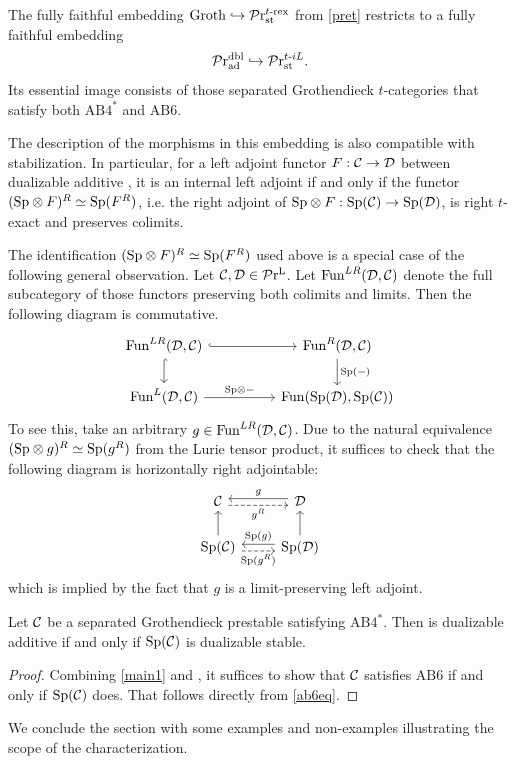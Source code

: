 \documentclass[a4paper,10pt, oneside]{amsart}
\begin{document}
\begin{cor}\label{dualaddembst}
	The fully faithful embedding $\mathrm{Groth} \hookrightarrow \mathcal{P}\mathrm{r}^{t\text{-rex}}_{\mathrm{st}}$ from \cref{pret} restricts to a fully faithful embedding 
	\[ \mathcal{P}\mathrm{r}_{\mathrm{ad}}^{\mathrm{dbl}} \hookrightarrow \mathcal{P}\mathrm{r}^{t\text{-}iL}_{\mathrm{st}}. \]
	Its essential image consists of those separated Grothendieck $t$-categories that satisfy both $\mathrm{AB4}^*$ and $\mathrm{AB6}$.
\end{cor}
	
	\begin{rem}
		The description of the morphisms in this embedding is also compatible with stabilization. In particular,  for a left adjoint functor $F:\mathcal{C}\to\mathcal{D}$ between dualizable additive \infcats, it is an internal left adjoint if and only if the functor $(\mathrm{Sp}\otimes F)^R\simeq\mathrm{Sp}(F^R)$, i.e. the right adjoint of $\mathrm{Sp}\otimes F :\mathrm{Sp}(\mathcal{C})\to\mathrm{Sp}(\mathcal{D})$, is right $t$-exact and preserves colimits.
	\end{rem}

	
	\begin{rem}
		The identification $(\mathrm{Sp}\otimes F)^R\simeq\mathrm{Sp}(F^R)$ used above is a special case of the following general observation.	Let $\mathcal{C},\mathcal{D}\in\mathcal{P}\mathrm{r}^\mathrm{L}$. Let $\operatorname{Fun}^{LR}(\mathcal{D},\mathcal{C})$ denote the full subcategory of those functors preserving both colimits and limits. Then the following diagram is commutative.
		$$\begin{tikzcd}
			{\funct^{LR}(\mcd,\mcc)} \arrow[rr, hook] \arrow[d, hook] &  & {\funct^{R}(\mcd,\mcc)} \arrow[d, "\opsp(-)"] \\
			{\funct^{L}(\mcd,\mcc)} \arrow[rr, "\opsp\otimes-"]       &  & {\funct(\op{Sp}(\mcd),\op{Sp}(\mcc))}        
		\end{tikzcd}$$
		To see this, take an arbitrary $g\in\operatorname{Fun}^{LR}(\mathcal{D},\mathcal{C})$. Due to the natural equivalence $(\mathrm{Sp}\otimes g)^R\simeq \mathrm{Sp}(g^R)$ from the Lurie tensor product, it suffices to check that the following diagram is horizontally right adjointable:
		$$\begin{tikzcd}
			\mcc \arrow[r, "g^R"', dashed, shift right]                             & \mcd \arrow[l, "g"', shift right]                             \\
			\op{Sp}(\mcc) \arrow[u] \arrow[r, "\op{Sp}(g^R)"', dashed, shift right] & \op{Sp}(\mcd) \arrow[u] \arrow[l, "\op{Sp}(g)"', shift right]
		\end{tikzcd}$$
		which is implied by the fact that $g$ is a limit-preserving left adjoint.
	\end{rem}

	\begin{cor}\label{dualadst}
		Let $\mathcal{C}$ be a separated Grothendieck  prestable \infcat satisfying $\mathrm{AB4}^*$. Then \mcc is dualizable additive if and only if $\mathrm{Sp}(\mathcal{C})$ is dualizable stable.
	\end{cor}
	\begin{proof}
	Combining \cref{main1} and \cite[Proposition 1.53]{efimov2024k}, it suffices to show that $\mathcal{C}$ satisfies $\mathrm{AB6}$ if and only if $\mathrm{Sp}(\mathcal{C})$ does.	That follows directly from  \cref{ab6eq}.
	\end{proof}
	We conclude the section with some examples and non-examples illustrating the scope of the characterization. 
	
\end{document}
